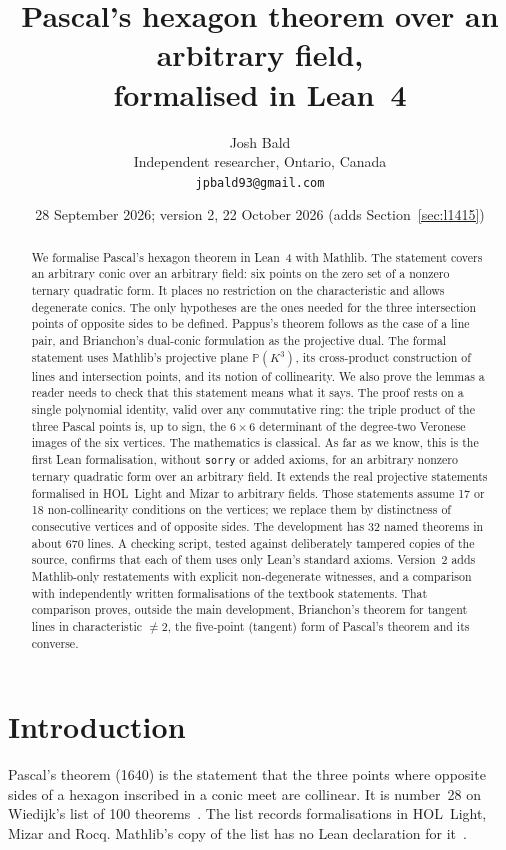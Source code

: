 \documentclass[11pt]{article}
\title{Pascal's hexagon theorem over an arbitrary field,\\ formalised in Lean~4}
\author{Josh Bald\\ \small Independent researcher, Ontario, Canada\\ \small\texttt{jpbald93@gmail.com}}
\date{28 September 2026; version 2, 22 October 2026 (adds Section~\ref{sec:l1415})}
\theoremstyle{remark}
\newcommand{\lean}[1]{\texttt{#1}}
\newcommand{\PP}{\mathbb{P}}
\begin{document}
\maketitle

\begin{abstract}
We formalise Pascal's hexagon theorem in Lean~4 with Mathlib. The statement covers an arbitrary
conic over an arbitrary field: six points on the zero set of a nonzero ternary quadratic form. It
places no restriction on the characteristic and allows degenerate conics. The only hypotheses are
the ones needed for the three intersection points of opposite sides to be defined. Pappus's
theorem follows as the case of a line pair, and Brianchon's dual-conic formulation as the projective dual. The formal statement uses Mathlib's projective plane
$\PP(K^3)$, its cross-product construction of lines and intersection points, and its notion of
collinearity. We also prove the lemmas a reader needs to check that this statement means what it
says. The proof rests on a single polynomial identity, valid over any commutative ring: the triple
product of the three Pascal points is, up to sign, the $6\times6$ determinant of the degree-two
Veronese images of the six vertices. The mathematics is classical. As far as we know, this is the first
Lean formalisation, without \lean{sorry} or added axioms, for an arbitrary nonzero ternary
quadratic form over an arbitrary field. It extends the real projective statements formalised in
HOL~Light and Mizar to arbitrary fields. Those statements assume 17 or 18 non-collinearity
conditions on the vertices; we replace them by distinctness of consecutive vertices and of
opposite sides. The development has 32 named theorems in about 670 lines. A
checking script, tested against deliberately tampered copies of the source, confirms that each of
them uses only Lean's standard axioms. Version~2 adds Mathlib-only restatements with explicit
non-degenerate witnesses, and a comparison with independently written formalisations of the textbook
statements. That comparison proves, outside the main development, Brianchon's theorem for tangent lines
in characteristic $\ne2$, the five-point (tangent) form of Pascal's theorem and its converse.
\end{abstract}

\section{Introduction}

Pascal's theorem (1640) is the statement that the three points where opposite sides of a hexagon
inscribed in a conic meet are collinear. It is number~28 on Wiedijk's list of 100
theorems~\cite{Wiedijk}. The list records formalisations in HOL~Light, Mizar and Rocq. Mathlib's
copy of the list has no Lean declaration for it~\cite{Mathlib100}.
\end{document}
